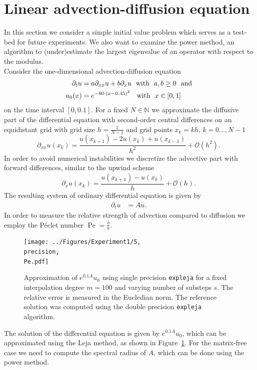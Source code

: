 \documentclass{scrartcl}
\begin{document}
\section{Linear advection-diffusion equation}\label{sec:LinearADe}
	In this section we consider a simple initial value problem which serves as a test-bed for future experiments. We also want to examine the power method, an algorithm to (under)estimate the largest eigenvalue of an operator with respect to the modulus.\\
	Consider the one-dimensional advection-diffusion equation
	\begin{align}
	\begin{split}
		\partial_tu &= a\partial_{xx}u + b\partial_xu ~~\text{with}~~ a,b\ge 0 ~~\text{and}\\
		u_0(x) &= e^{-80\cdot(x-0.45)^2}\hphantom{,} ~~\text{with}~~ x\in[0,1]
	\end{split}\label{eq:LinearAdvDif}
	\end{align}
	on the time interval $[0,0.1]$. For a fixed $N\in\mathbb N$ we approximate the diffusive part of the differential equation with second-order central differences on an equidistant grid with grid size $h = \frac{1}{N-1}$ and grid points $x_k = kh$, $k=0\dots,N-1$
	\[\partial_{xx}u(x_k) = \frac{u(x_{k+1}) - 2u(x_k) + u(x_{k-1})}{{h}^2} + \mathcal{O}({h}^2).\]
	In order to avoid numerical instabilities we discretize the advective part with forward differences, similar to the upwind scheme
	\[\partial_{x}u(x_k) = \frac{u(x_{k+1}) - u(x_k)}{h} + \mathcal{O}(h).\]
	The resulting system of ordinary differential equation is given by
	\begin{align*}
		\partial_tu &= Au.
	\end{align*}
	In order to measure the relative strength of advection compared to diffusion we employ the P\'eclet number $\operatorname{Pe} = \frac{b}{a}$.
	\begin{figure}[ht]
		\newcommand{\precision}{single}
		\newcommand{\Pe}{Pe=10.0}
		\centering
		\texttt{[image: ../Figures/Experiment1/5, \\precision, \\Pe.pdf]}
		\caption{Approximation of $e^{0.1A}u_0$ using single precision \texttt{expleja} for a fixed interpolation degree $m=100$ and varying number of substeps $s$. The relative error is measured in the Eucledian norm. The reference solution was computed using the double precision \texttt{expleja} algorithm.}
		\label{fig:Experiment1}
	\end{figure} 
	\noindent The solution of the differential equation is given by $e^{0.1A}u_0$, which can be approximated using the Leja method, as shown in Figure~\ref{fig:Experiment1}. For the matrix-free case we need to compute the spectral radius of $A$, which can be done using the power method.
	
\end{document}
